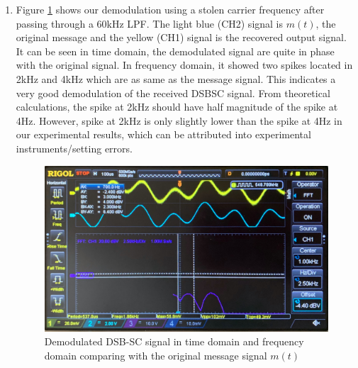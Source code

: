 \documentclass[11pt]{article}
\begin{document}
\begin{enumerate}[label=(\alph*)]
\item %
Figure \ref{fig:q3c} shows our demodulation using a stolen carrier frequency after passing through a 60kHz LPF. The light blue (CH2) signal is $m(t)$, the original message and the yellow (CH1) signal is the recovered output signal. It can be seen in time domain, the demodulated signal are quite in phase with the original signal. In frequency domain, it showed two spikes located in 2kHz and 4kHz which are as same as the message signal. This indicates a very good demodulation of the received DSBSC signal. From theoretical calculations, the spike at 2kHz should have half magnitude of the spike at 4Hz. However, spike at 2kHz is only slightly lower than the spike at 4Hz in our experimental results, which can be attributed into experimental instruments/setting errors. 
\begin{figure}[H]
    \centering
    \includegraphics[scale = 0.135]{Q3c.jpg}
    \caption{\label{fig:q3c}Demodulated DSB-SC signal in time domain and frequency domain comparing with the original message signal $m(t)$}
\end{figure}


\end{enumerate}
\end{document}
